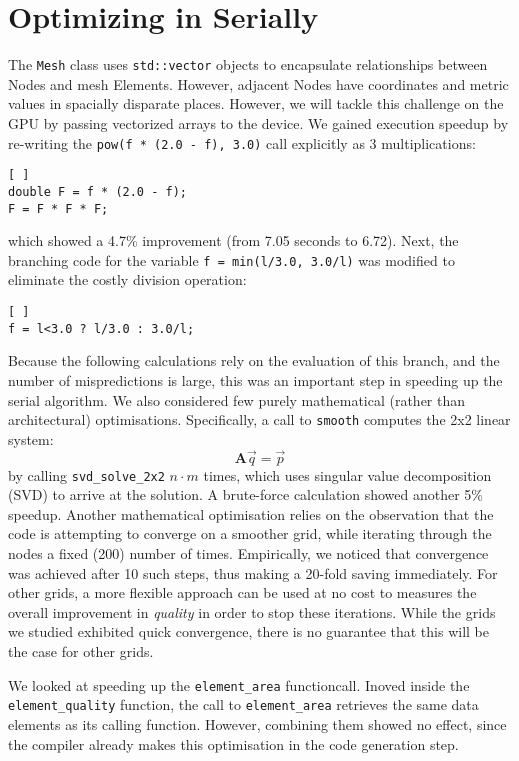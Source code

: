\documentclass[a4paper,11pt, twocolumn]{article}
\begin{document}
\section{Optimizing in Serially}
The \verb+Mesh+ class uses \verb+std::vector+ objects to encapsulate relationships between Nodes and mesh Elements.  However, adjacent Nodes have coordinates and metric values in spacially disparate places.  However, we will tackle this challenge on the GPU by passing vectorized arrays to the device.  
We gained execution speedup by re-writing the \verb+pow(f * (2.0 - f), 3.0)+ call explicitly as 3 multiplications:
\begin{lstlisting}[ ]
double F = f * (2.0 - f);
F = F * F * F;
\end{lstlisting}
which showed a 4.7\% improvement (from 7.05 seconds to 6.72).  Next, the branching code for the variable \verb+f = min(l/3.0, 3.0/l)+ was modified to eliminate the costly division operation:
\begin{lstlisting}[ ]
f = l<3.0 ? l/3.0 : 3.0/l;
\end{lstlisting}
Because the following calculations rely on the evaluation of this branch, and the number of mispredictions is large, this was an important step in speeding up the serial algorithm.
We also considered few purely mathematical (rather than architectural) optimisations.  Specifically, a call to \verb+smooth+ computes the 2x2 linear system:
$$
\mathbf{A}\vec{q} = \vec{p}
$$
by calling \verb+svd_solve_2x2+ $n \cdot m$ times, which uses singular value decomposition (SVD) to arrive at the solution.  A brute-force calculation showed another 5\% speedup.  Another mathematical optimisation relies on the observation that the code is attempting to converge on a smoother grid, while iterating through the nodes a fixed (200) number of times.  Empirically, we noticed that convergence was achieved after 10 such steps, thus making a 20-fold saving immediately.  For other grids, a more flexible approach can be used at no cost to measures the overall improvement in \emph{quality} in order to stop these iterations.  While the grids we studied exhibited quick convergence, there is no guarantee that this will be the case for other grids.

We looked at speeding up the \verb+element_area+ functioncall.  Inoved inside the \verb+element_quality+ function, the call to \verb+element_area+ retrieves the same data elements as its calling function.  However, combining them showed no effect, since the compiler already makes this optimisation in the code generation step.  
\end{document}

